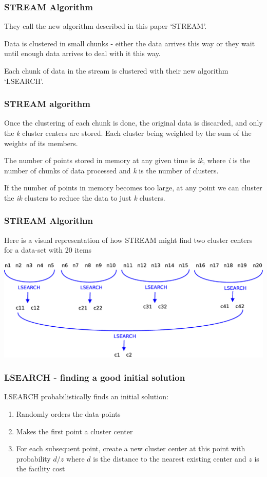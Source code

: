 \documentclass{beamer}
\begin{document}
\frame
{
  \frametitle{STREAM Algorithm}

  They call the new algorithm described in this paper `STREAM'.

  \bigskip
  Data is clustered in small chunks - either the data
  arrives this way or they wait until enough data arrives to deal with
  it this way.

  \bigskip
  Each chunk of data in the stream is clustered with their new
  algorithm `LSEARCH'.

}


\frame
{
  \frametitle{STREAM algorithm}


 Once the clustering of each chunk is done, the original data is
 discarded, and only the {\em k} cluster centers are stored. Each
 cluster being weighted by the sum of the weights of its members.

 \bigskip
 The number of points stored in memory at any given time is {\em ik},
 where {\em i} is the number of chunks of data processed and {\em k}
 is the number of clusters.

 \bigskip
 If the number of points in memory becomes too large, at any point we
 can cluster the {\em ik} clusters to reduce the data to just {\em k}
 clusters.

}


\frame
{
  \frametitle{STREAM Algorithm}
  Here is a visual representation of how STREAM might find two cluster
  centers for a data-set with 20 items
  
  \bigskip
  \begin{center}
  \includegraphics[width=\textwidth]{figures/STREAM}      
  \end{center}
}

\frame
{
  \frametitle{LSEARCH - finding a good initial solution}
  
  LSEARCH probabilistically finds an initial solution:
  
  \bigskip
  \begin{enumerate}
  	\item{Randomly orders the data-points}
  	\item{Makes the first point a cluster center}
  	\item{For each subsequent point, create a new cluster center
  	at this point with probability $d/z$ where $d$ is the distance to 
  	the nearest existing center and $z$ is the facility cost}
  \end{enumerate}
  
}
\end{document}

